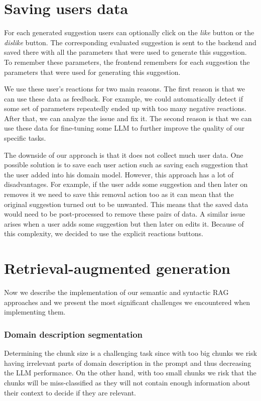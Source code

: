 \section{Saving users data}

For each generated suggestion users can optionally click on the \textit{like} button or the \textit{dislike} button. The corresponding evaluated suggestion is sent to the backend and saved there with all the parameters that were used to generate this suggestion. To remember these parameters, the frontend remembers for each suggestion the parameters that were used for generating this suggestion.

We use these user's reactions for two main reasons. The first reason is that we can use these data as feedback. For example, we could automatically detect if some set of parameters repeatedly ended up with too many negative reactions. After that, we can analyze the issue and fix it. The second reason is that we can use these data for fine-tuning some LLM to further improve the quality of our specific tasks.

The downside of our approach is that it does not collect much user data. One possible solution is to save each user action such as saving each suggestion that the user added into his domain model. However, this approach has a lot of disadvantages. For example, if the user adds some suggestion and then later on removes it we need to save this removal action too as it can mean that the original suggestion turned out to be unwanted. This means that the saved data would need to be post-processed to remove these pairs of data. A similar issue arises when a user adds some suggestion but then later on edits it. Because of this complexity, we decided to use the explicit reactions buttons.


\section{Retrieval-augmented generation}
\label{sec:rag_implementation}

Now we describe the implementation of our semantic and syntactic RAG approaches and we present the most significant challenges we encountered when implementing them.


\subsubsection{Domain description segmentation}

Determining the chunk size is a challenging task since with too big chunks we risk having irrelevant parts of domain description in the prompt and thus decreasing the LLM performance. On the other hand, with too small chunks we risk that the chunks will be miss-classified as they will not contain enough information about their context to decide if they are relevant.

